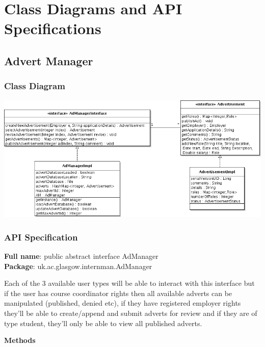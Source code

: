 \documentclass[11pt]{l3deliverable}
\begin{document}
\newpage

\section{Class Diagrams and API Specifications}

\subsection{Advert Manager}

\subsubsection{Class Diagram}

\includegraphics[width=\textwidth]{adManagerClassDiagram.png}

\subsubsection{API Specification}

\textbf{Full name}: public abstract interface AdManager\\

\textbf{Package}: uk.ac.glasgow.internman.AdManager

Each of the 3 available user types will be able to interact with this interface
but if the user has course coordinator rights then all available adverts can be
manipulated (published, denied etc), if they have registered employer rights
they'll be able to create/append and submit adverts for review and if they are
of type student, they'll only be able to view all published adverts.

\textbf{Methods}
\end{document}
